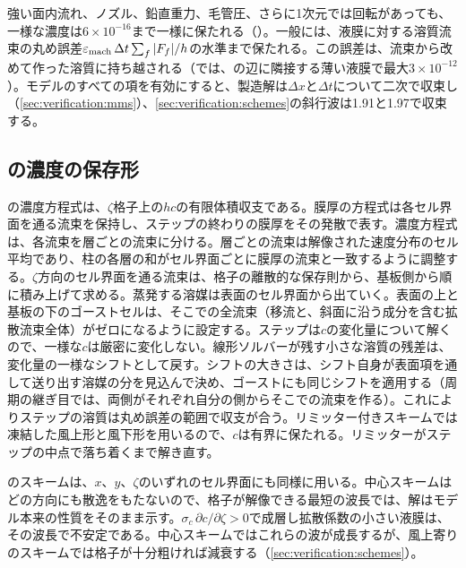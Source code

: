 強い面内流れ、ノズル、鉛直重力、毛管圧、さらに1次元では回転があっても、一様な濃度は$6\times10^{-16}$まで一様に保たれる（）。一般には、液膜に対する溶質流束の丸め誤差$\varepsilon_{\mathrm{mach}}\,\Delta t\sum_f|F_f|/h$の水準まで保たれる。この誤差は、流束から改めて作った溶質に持ち越される（では、の辺に隣接する薄い液膜で最大$3\times10^{-12}$）。モデルのすべての項を有効にすると、製造解は$\Delta x$と$\Delta t$について二次で収束し（\cref{sec:verification:mms}）、\cref{sec:verification:schemes}の斜行波は1.91と1.97で収束する。

\subsection{\texorpdfstring{}{CZ}の濃度の保存形}
\label{sec:disc:cz-conservative}

の濃度方程式は、$\zeta$格子上の$hc$の有限体積収支である。膜厚の方程式は各セル界面を通る流束を保持し、ステップの終わりの膜厚をその発散で表す。濃度方程式は、各流束を層ごとの流束に分ける。層ごとの流束は解像された速度分布のセル平均であり、柱の各層の和がセル界面ごとに膜厚の流束と一致するように調整する。$\zeta$方向のセル界面を通る流束は、格子の離散的な保存則から、基板側から順に積み上げて求める。蒸発する溶媒は表面のセル界面から出ていく。表面の上と基板の下のゴーストセルは、そこでの全流束（移流と、斜面に沿う成分を含む拡散流束全体）がゼロになるように設定する。ステップは$c$の変化量について解くので、一様な$c$は厳密に変化しない。線形ソルバーが残す小さな溶質の残差は、変化量の一様なシフトとして戻す。シフトの大きさは、シフト自身が表面項を通して送り出す溶媒の分を見込んで決め、ゴーストにも同じシフトを適用する（周期の継ぎ目では、両側がそれぞれ自分の側からそこでの流束を作る）。これによりステップの溶質は丸め誤差の範囲で収支が合う。リミッター付きスキームでは凍結した風上形と風下形を用いるので、$c$は有界に保たれる。リミッターがステップの中点で落ち着くまで解き直す。

のスキームは、$x$、$y$、$\zeta$のいずれのセル界面にも同様に用いる。中心スキームはどの方向にも散逸をもたないので、格子が解像できる最短の波長では、解はモデル本来の性質をそのまま示す。$\sigma_c\,\partial c/\partial\zeta
> 0$で成層し拡散係数の小さい液膜は、その波長で不安定である。中心スキームではこれらの波が成長するが、風上寄りのスキームでは格子が十分粗ければ減衰する（\cref{sec:verification:schemes}）。

